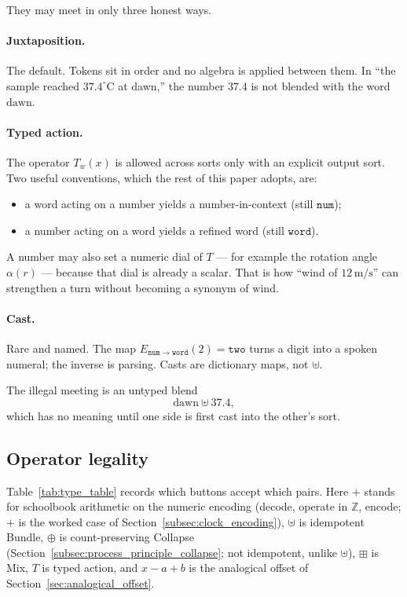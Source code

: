 \documentclass[12pt, a4paper]{article}
\begin{document}
They may meet in only three honest ways.

\paragraph{Juxtaposition.}
The default. Tokens sit in order and no algebra is applied between
them. In ``the sample reached $37.4^\circ\mathrm{C}$ at dawn,'' the
number $37.4$ is not blended with the word $\mathrm{dawn}$.

\paragraph{Typed action.}
The operator $T_w(x)$ is allowed across sorts only with an explicit
output sort. Two useful conventions, which the rest of this paper
adopts, are:
\begin{itemize}
    \item a word acting on a number yields a number-in-context
          (still $\mathtt{num}$);
    \item a number acting on a word yields a refined word
          (still $\mathtt{word}$).
\end{itemize}
A number may also set a numeric dial of $T$ --- for example the
rotation angle $\alpha(r)$ --- because that dial is already a scalar.
That is how ``wind of $12\,\mathrm{m/s}$'' can strengthen a turn
without becoming a synonym of $\mathrm{wind}$.

\paragraph{Cast.}
Rare and named. The map $E_{\mathtt{num}\to\mathtt{word}}(2)=\texttt{two}$
turns a digit into a spoken numeral; the inverse is parsing. Casts are
dictionary maps, not $\uplus$.

The illegal meeting is an untyped blend
\begin{equation}
    \mathrm{dawn} \uplus 37.4,
\end{equation}
which has no meaning until one side is first cast into the other's
sort.

\subsection{Operator legality}
\label{subsec:type_table}
Table~\ref{tab:type_table} records which buttons accept which pairs.
Here $+$ stands for schoolbook arithmetic on the numeric encoding
(decode, operate in $\mathbb{Z}$, encode; $+$ is the worked case of
Section~\ref{subsec:clock_encoding}), $\uplus$ is
idempotent Bundle, $\oplus$ is count-preserving Collapse
(Section~\ref{subsec:process_principle_collapse}; not idempotent,
unlike $\uplus$), $\boxplus$ is Mix, $T$ is typed action, and $x-a+b$ is the analogical
offset of Section~\ref{sec:analogical_offset}.
\end{document}
